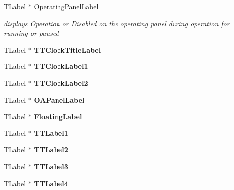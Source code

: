 \begin{DoxyCompactItemize}
\mbox{\label{class_t_interface_a167b9a4eba88ea3020f67a1c89907838}} 
T\+Label $\ast$ \mbox{\hyperlink{class_t_interface_a167b9a4eba88ea3020f67a1c89907838}{Operating\+Panel\+Label}}
\begin{DoxyCompactList}\small\item\em displays \textquotesingle{}Operation\textquotesingle{} or \textquotesingle{}Disabled\textquotesingle{} on the operating panel during operation for running or paused \end{DoxyCompactList}\item 
\mbox{\label{class_t_interface_a2d641fff539cab58c2a833cf3ed63e72}} 
T\+Label $\ast$ {\bfseries T\+T\+Clock\+Title\+Label}
\item 
\mbox{\label{class_t_interface_a19f0b0173b71d400eed6de0b32cf52c6}} 
T\+Label $\ast$ {\bfseries T\+T\+Clock\+Label1}
\item 
\mbox{\label{class_t_interface_a4ea88dbbf3539f837e0e6eefcc127214}} 
T\+Label $\ast$ {\bfseries T\+T\+Clock\+Label2}
\item 
\mbox{\label{class_t_interface_ac09986496b415b12787f5896be321ebe}} 
T\+Label $\ast$ {\bfseries O\+A\+Panel\+Label}
\item 
\mbox{\label{class_t_interface_a1ec3d5df7eb6dbab750a63c46710e7bc}} 
T\+Label $\ast$ {\bfseries Floating\+Label}
\item 
\mbox{\label{class_t_interface_aaf476d1498548ff2b79c6cb0e85b6f2e}} 
T\+Label $\ast$ {\bfseries T\+T\+Label1}
\item 
\mbox{\label{class_t_interface_a49b00f8f498e555c564128569ba79fb1}} 
T\+Label $\ast$ {\bfseries T\+T\+Label2}
\item 
\mbox{\label{class_t_interface_a325ea4861a87491ea0a02bb1b9828900}} 
T\+Label $\ast$ {\bfseries T\+T\+Label3}
\item 
\mbox{\label{class_t_interface_a6b94e181d30b95fef0a03d665ec6bff7}} 
T\+Label $\ast$ {\bfseries T\+T\+Label4}

\end{DoxyCompactItemize}
